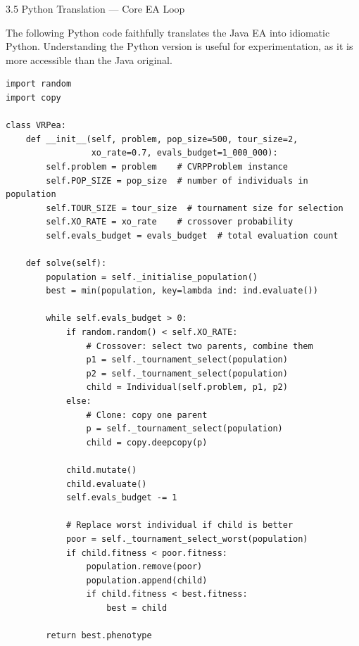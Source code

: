 \documentclass[aspectratio=169,10pt]{beamer}
\begin{document}
\begin{frame}[fragile]{3.5 Python Translation — Core EA Loop}

  The following Python code faithfully translates the Java EA into idiomatic Python.
  Understanding the Python version is useful for experimentation, as it is more accessible
  than the Java original.

  \begin{lstlisting}[style=pythonstyle,caption={Python: main evolutionary loop}]
import random
import copy

class VRPea:
    def __init__(self, problem, pop_size=500, tour_size=2,
                 xo_rate=0.7, evals_budget=1_000_000):
        self.problem = problem    # CVRPProblem instance
        self.POP_SIZE = pop_size  # number of individuals in population
        self.TOUR_SIZE = tour_size  # tournament size for selection
        self.XO_RATE = xo_rate    # crossover probability
        self.evals_budget = evals_budget  # total evaluation count

    def solve(self):
        population = self._initialise_population()
        best = min(population, key=lambda ind: ind.evaluate())

        while self.evals_budget > 0:
            if random.random() < self.XO_RATE:
                # Crossover: select two parents, combine them
                p1 = self._tournament_select(population)
                p2 = self._tournament_select(population)
                child = Individual(self.problem, p1, p2)
            else:
                # Clone: copy one parent
                p = self._tournament_select(population)
                child = copy.deepcopy(p)

            child.mutate()
            child.evaluate()
            self.evals_budget -= 1

            # Replace worst individual if child is better
            poor = self._tournament_select_worst(population)
            if child.fitness < poor.fitness:
                population.remove(poor)
                population.append(child)
                if child.fitness < best.fitness:
                    best = child

        return best.phenotype
  \end{lstlisting}

\end{frame}
\end{document}
